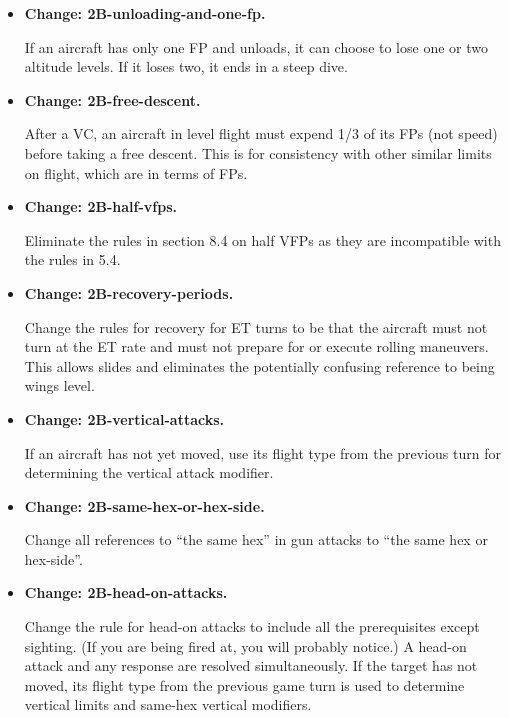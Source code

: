 \documentclass{report}
\newcommand{\changetag}[1]{\textbf{Change: #1.}\par}
\begin{document}
\begin{itemize}
        Therefore, I have changed the unloaded dive rule so that all FPs are HFPs, but that if the aircraft loses a level if it unloads for at least half its FPs and loses another if it unloads for all its FPs. These loses are similar to those from free descent, in that they occur during HFPs. With this rule, an aircraft with sox FPs can have six HFPs and lose two levels, which does give an advantage over a steep dive.

    \item\changetag{2B-unloading-and-one-fp}

        If an aircraft has only one FP and unloads, it can choose to lose one or two altitude levels. If it loses two, it ends in a steep dive.

    \item\changetag{2B-free-descent}

        After a VC, an aircraft in level flight must expend 1/3 of its FPs (not speed) before taking a free descent. This is for consistency with other similar limits on flight, which are in terms of FPs.

    \item\changetag{2B-half-vfps}

        Eliminate the rules in section 8.4 on half VFPs as they are incompatible with the rules in 5.4.

    \item\changetag{2B-recovery-periods}

        Change the rules for recovery for ET turns to be that the aircraft must not turn at the ET rate and must not prepare for or execute rolling maneuvers. This allows slides and eliminates the potentially confusing reference to being wings level.

    \item\changetag{2B-vertical-attacks}

        If an aircraft has not yet moved, use its flight type from the previous turn for determining the vertical attack modifier.

    \item\changetag{2B-same-hex-or-hex-side}

        Change all references to “the same hex” in gun attacks to “the same hex or hex-side”.

    \item\changetag{2B-head-on-attacks}

        Change the rule for head-on attacks to include all the prerequisites except sighting. (If you are being fired at, you will probably notice.) A head-on attack and any response are resolved simultaneously. If the target has not moved, its flight type from the previous game turn is used to determine vertical limits and same-hex vertical modifiers.


\end{itemize}
\end{document}
